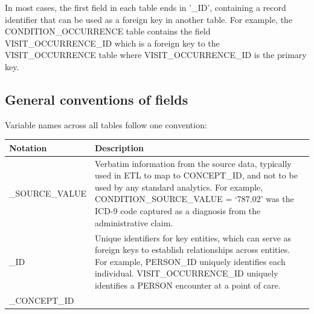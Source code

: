 \documentclass[]{book}
\begin{document}
In most cases, the first field in each table ends in '\_ID', containing
a record identifier that can be used as a foreign key in another table.
For example, the CONDITION\_OCCURRENCE table contains the field
VISIT\_OCCURRENCE\_ID which is a foreign key to the VISIT\_OCCURRENCE
table where VISIT\_OCCURRENCE\_ID is the primary key.

\subsection{General conventions of
fields}\label{general-conventions-of-fields}

Variable names across all tables follow one convention:

\begin{longtable}[]{@{}ll@{}}
\toprule
\begin{minipage}[b]{0.24\columnwidth}\raggedright\strut
Notation\strut
\end{minipage} & \begin{minipage}[b]{0.70\columnwidth}\raggedright\strut
Description\strut
\end{minipage}\tabularnewline
\midrule
\endhead
\begin{minipage}[t]{0.24\columnwidth}\raggedright\strut
\_SOURCE\_VALUE\strut
\end{minipage} & \begin{minipage}[t]{0.70\columnwidth}\raggedright\strut
Verbatim information from the source data, typically used in ETL to map
to CONCEPT\_ID, and not to be used by any standard analytics. For
example, CONDITION\_SOURCE\_VALUE = `787.02' was the ICD-9 code captured
as a diagnosis from the administrative claim.\strut
\end{minipage}\tabularnewline
\begin{minipage}[t]{0.24\columnwidth}\raggedright\strut
\_ID\strut
\end{minipage} & \begin{minipage}[t]{0.70\columnwidth}\raggedright\strut
Unique identifiers for key entities, which can serve as foreign keys to
establish relationships across entities. For example, PERSON\_ID
uniquely identifies each individual. VISIT\_OCCURRENCE\_ID uniquely
identifies a PERSON encounter at a point of care.\strut
\end{minipage}\tabularnewline
\begin{minipage}[t]{0.24\columnwidth}\raggedright\strut
\_CONCEPT\_ID\strut
\end{minipage} & \begin{minipage}[t]{0.70\columnwidth}\raggedright\strut

\end{minipage}
\end{longtable}
\end{document}

